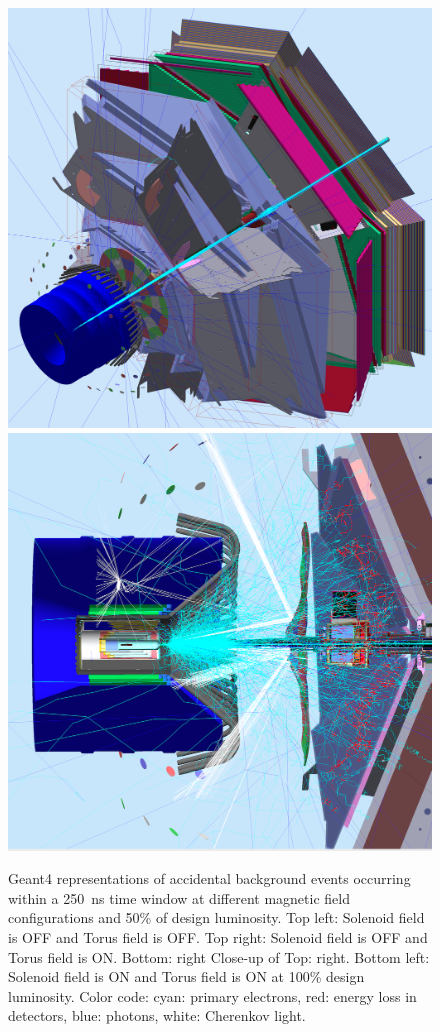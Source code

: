 \documentclass[final,3p,twocolumn]{elsarticle}
\begin{document}
\begin{figure}[htbp!]
\centerline{\includegraphics[width=1.0\columnwidth]{100percentSolenoid.png}
\includegraphics[width=1.0\columnwidth]{50percentNoSolenoidCut3a.png}}
\caption{Geant4 representations of accidental background events occurring within a 250~ns time window at different
magnetic field configurations and 50\% of design luminosity. Top left: Solenoid field is OFF and Torus field is OFF. Top
right: Solenoid field is OFF and Torus field is ON. Bottom: right Close-up of Top: right.  Bottom left: Solenoid field is ON
and Torus field is ON at 100\% design luminosity. Color code: cyan: primary electrons, red: energy loss in detectors, blue:
photons, white: Cherenkov light. } 
\label{gemc-event}
\end{figure}
\end{document}
